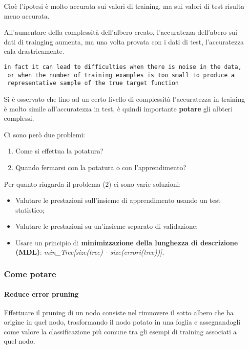 Cioè l'ipotesi è molto accurata sui valori di training, ma sui valori di
test risulta meno accurata.

All'aumentare della complessità dell'albero creato, l'accuratezza
dell'abero sui dati di trainging aumenta, ma una volta provata con i
dati di test, l'accuratezza cala drastricamente.

\begin{verbatim}
in fact it can lead to difficulties when there is noise in the data,
 or when the number of training examples is too small to produce a 
 representative sample of the true target function
\end{verbatim}

Si è osservato che fino ad un certo livello di complessità l'accuratezza
in training è molto simile all'accuratezza in test, è quindi importante
\textbf{potare} gli albteri complessi.

Ci sono però due problemi:

\begin{enumerate}
\def\labelenumi{\arabic{enumi}.}
\tightlist
\item
  Come si effettua la potatura?
\item
  Quando fermarsi con la potatura o con l'apprendimento?
\end{enumerate}

Per quanto riugarda il problema (2) ci sono varie soluzioni:

\begin{itemize}
\tightlist
\item
  Valutare le prestazioni sull'insieme di apprendimento usando un test
  statistico;
\item
  Valutare le prestazioni su un'insieme separato di validazione;
\item
  Usare un principio di \textbf{minimizzazione della lunghezza di
  descrizione (MDL)}: \emph{min\_Tree{[}size(tree) -
  size(errori(tree)){]}.}
\end{itemize}

\subsubsection{Come potare}\label{come-potare}

\paragraph{Reduce error pruning}\label{reduce-error-pruning}

Effettuare il pruning di un nodo consiste nel rimuovere il sotto albero
che ha origine in quel nodo, trasformando il nodo potato in una foglia e
assegnandogli come valore la classificazione più comune tra gli esempi
di training associati a quel nodo.

